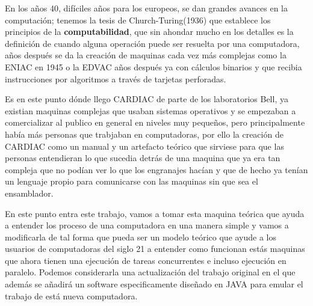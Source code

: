 \documentclass[12pt]{article}
\begin{document}
	
	En los años 40, difíciles años para los
	europeos, se dan grandes avances en la computación; tenemos la tesis de Church-Turing(1936) que establece los principios de la \textbf{computabilidad}, que
	sin ahondar mucho en los detalles es la definición de cuando alguna operación puede ser resuelta por una computadora, años después se da la creación
	de maquinas cada vez más complejas como la ENIAC en 1945 o la EDVAC años después ya con cálculos binarios y que recibia instrucciones por algoritmos
	a través de tarjetas perforadas.
	
	
	Es en este punto dónde llego CARDIAC de parte de los laboratorios Bell, ya existian maquinas complejas que usaban sistemas operativos y se empezaban
	a comercializar al publico en general en niveles muy pequeños, pero principalmente había más personas que trabjaban en computadoras, por ello la creación
	de CARDIAC como un manual y un artefacto teórico que sirviese para que las personas entendieran lo que sucedia detrás de una maquina que ya era tan compleja
	que no podían ver lo que los engranajes hacían y que de hecho ya tenían un lenguaje propio para comunicarse con las maquinas sin que sea el ensamblador.
	
	En este punto entra este trabajo, vamos a tomar esta maquina teórica que ayuda a entender los proceso de una computadora en una manera simple y vamos
	a modificarla de tal forma que pueda ser un modelo teórico que ayude a los usuarios de computadoras del siglo 21 a entender como funcionan estás maquinas
	que ahora tienen una ejecución de tareas concurrentes e incluso ejecución en paralelo. Podemos considerarla una actualización del trabajo original en el que
	además se añadirá un software especificamente diseñado en JAVA para emular el trabajo de está nueva computadora.
	
\end{document}
